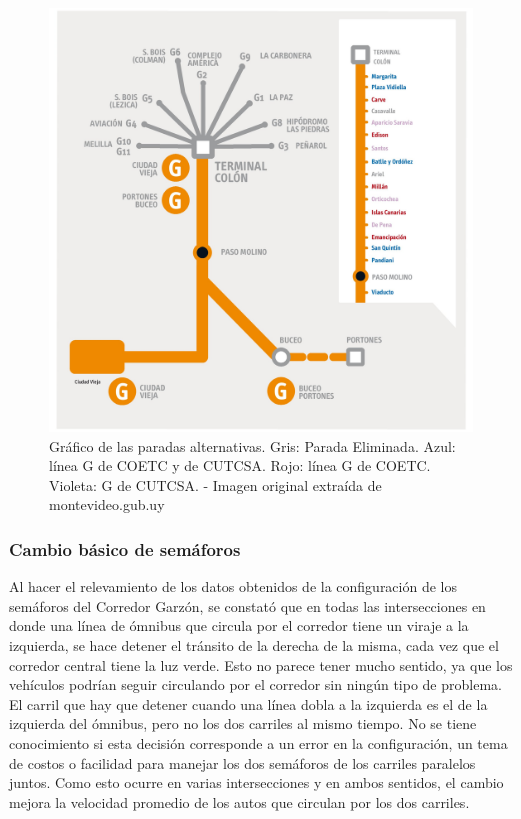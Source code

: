 \begin{figure}[ht]
	\centering
	\includegraphics[width=0.9\linewidth]{Figures/paradas_alternativas}
	\caption[Gráfico de las paradas alternativas.]{Gráfico de las paradas alternativas. Gris: Parada Eliminada. Azul: línea G de COETC y de CUTCSA. Rojo: línea G de COETC. Violeta: G de CUTCSA. - Imagen original extraída de montevideo.gub.uy}
	\label{fig:paradas_alternadas}
\end{figure}



\subsubsection{Cambio básico de semáforos}
Al hacer el relevamiento de los datos obtenidos de la configuración de los semáforos del Corredor Garzón, se constató que en todas las intersecciones en donde una línea de ómnibus que circula por el corredor tiene un viraje a la izquierda, se hace detener el tránsito de la derecha de la misma, cada vez que el corredor central tiene la luz verde. Esto no parece tener mucho sentido, ya que los vehículos podrían seguir circulando por el corredor sin ningún tipo de problema. El carril que hay que detener cuando una línea dobla a la izquierda es el de la izquierda del ómnibus, pero no los dos carriles al mismo tiempo. No se tiene conocimiento si esta decisión corresponde a un error en la configuración, un tema de costos o facilidad para manejar los dos semáforos de los carriles paralelos juntos. Como esto ocurre en varias intersecciones y en ambos sentidos, el cambio mejora la velocidad promedio de los autos que circulan por los dos carriles.

